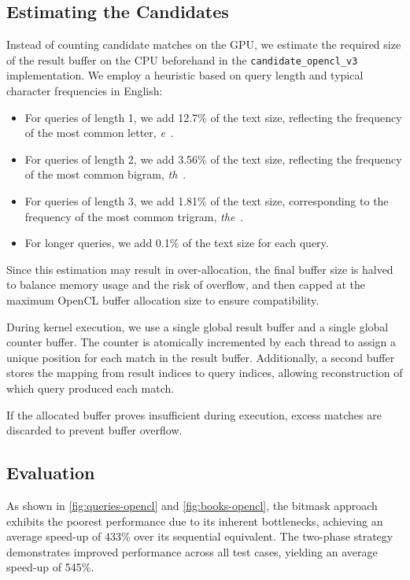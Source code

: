 \documentclass{article}
\begin{document}
    \subsection{Estimating the Candidates}
    Instead of counting candidate matches on the GPU, we estimate the required size of the result buffer on the CPU beforehand in the \texttt{candidate\_opencl\_v3} implementation.
    We employ a heuristic based on query length and typical character frequencies in English:
    \begin{itemize}
        \item For queries of length 1, we add 12.7\% of the text size, reflecting the frequency of the most common letter, \emph{e}~\cite{letter-frequency}.
        \item For queries of length 2, we add 3.56\% of the text size, reflecting the frequency of the most common bigram, \emph{th}~\cite{bigram}.
        \item For queries of length 3, we add 1.81\% of the text size, corresponding to the frequency of the most common trigram, \emph{the}~\cite{trigram}.
        \item For longer queries, we add 0.1\% of the text size for each query.
    \end{itemize}
    Since this estimation may result in over-allocation, the final buffer size is halved to balance memory usage and the risk of overflow, and then capped at the maximum OpenCL buffer allocation size to ensure compatibility.

    During kernel execution, we use a single global result buffer and a single global counter buffer.
    The counter is atomically incremented by each thread to assign a unique position for each match in the result buffer.
    Additionally, a second buffer stores the mapping from result indices to query indices, allowing reconstruction of which query produced each match.

    If the allocated buffer proves insufficient during execution, excess matches are discarded to prevent buffer overflow.

    \subsection{Evaluation}
    As shown in \autoref{fig:queries-opencl} and \autoref{fig:books-opencl}, the bitmask approach exhibits the poorest performance due to its inherent bottlenecks, achieving an average speed-up of 433\% over its sequential equivalent.
    The two-phase strategy demonstrates improved performance across all test cases, yielding an average speed-up of 545\%.
\end{document}
